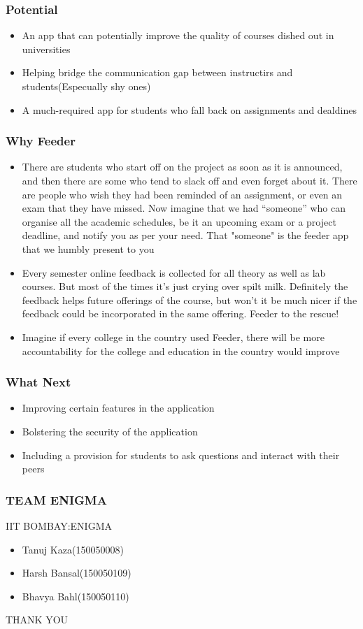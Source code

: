 \documentclass{beamer}
\begin{document}
\begin{frame}
\frametitle{Potential}
\begin{itemize}
\item An app that can potentially improve the quality of courses dished out in universities
\item Helping bridge the communication gap between instructirs and students(Especually shy ones)
\item A much-required app for students who fall back on assignments and dealdines
\end{itemize}
\end{frame}

\begin{frame}
\frametitle{Why Feeder}
\begin{itemize}
\item There are students who start off on the project as soon as it is announced, and then there are some who tend to slack off and even forget about it. There are people who wish they had been reminded of an assignment, or even an exam that they have missed. Now imagine that we had “someone” who can organise all the academic schedules, be it an upcoming exam or a project deadline, and notify you as per your need. That "someone" is the feeder app that we humbly present to you
\item Every semester online feedback is collected for all theory as well as lab courses. But most of the times it’s just crying over spilt milk. Definitely the feedback helps future offerings of the course, but won’t it be much nicer if the feedback could be incorporated in the same offering. Feeder to the rescue!
\item Imagine if every college in the country used Feeder, there will be more accountability for the college and education in the country would improve
\end{itemize}
\end{frame}

\begin{frame}
\frametitle{What Next}
\begin{itemize}
\item Improving certain features in the application
\item Bolstering the security of the application
\item Including a provision for students to ask questions and interact with their peers
\end{itemize}
\end{frame}

\begin{frame}
\frametitle{TEAM ENIGMA}
\centerline{IIT BOMBAY:ENIGMA}
\begin{itemize}
\item Tanuj Kaza(150050008)
\item Harsh Bansal(150050109)
\item Bhavya Bahl(150050110)
\end{itemize}
\end{frame}

\begin{frame}
\Huge{\centerline{THANK YOU}}
\end{frame}
\end{document}
